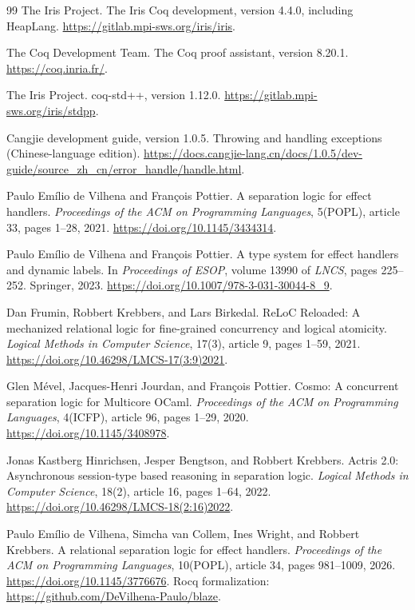 \documentclass[11pt]{article}
\begin{document}
\begin{thebibliography}{99}
The Iris Project.
The Iris Coq development, version 4.4.0, including HeapLang.
\url{https://gitlab.mpi-sws.org/iris/iris}.

The Coq Development Team.
The Coq proof assistant, version 8.20.1.
\url{https://coq.inria.fr/}.

The Iris Project.
coq-std++, version 1.12.0.
\url{https://gitlab.mpi-sws.org/iris/stdpp}.

Cangjie development guide, version 1.0.5.
Throwing and handling exceptions (Chinese-language edition).
\url{https://docs.cangjie-lang.cn/docs/1.0.5/dev-guide/source_zh_cn/error_handle/handle.html}.

Paulo Em\'ilio de Vilhena and Fran\c{c}ois Pottier.
A separation logic for effect handlers.
\emph{Proceedings of the ACM on Programming Languages}, 5(POPL), article 33, pages 1--28, 2021.
\url{https://doi.org/10.1145/3434314}.

Paulo Em\'ilio de Vilhena and Fran\c{c}ois Pottier.
A type system for effect handlers and dynamic labels.
In \emph{Proceedings of ESOP}, volume 13990 of \emph{LNCS}, pages 225--252. Springer, 2023.
\url{https://doi.org/10.1007/978-3-031-30044-8_9}.

Dan Frumin, Robbert Krebbers, and Lars Birkedal.
ReLoC Reloaded: A mechanized relational logic for fine-grained concurrency and logical atomicity.
\emph{Logical Methods in Computer Science}, 17(3), article 9, pages 1--59, 2021.
\url{https://doi.org/10.46298/LMCS-17(3:9)2021}.

Glen M\'evel, Jacques-Henri Jourdan, and Fran\c{c}ois Pottier.
Cosmo: A concurrent separation logic for Multicore OCaml.
\emph{Proceedings of the ACM on Programming Languages}, 4(ICFP), article 96, pages 1--29, 2020.
\url{https://doi.org/10.1145/3408978}.

Jonas Kastberg Hinrichsen, Jesper Bengtson, and Robbert Krebbers.
Actris 2.0: Asynchronous session-type based reasoning in separation logic.
\emph{Logical Methods in Computer Science}, 18(2), article 16, pages 1--64, 2022.
\url{https://doi.org/10.46298/LMCS-18(2:16)2022}.

Paulo Em\'ilio de Vilhena, Simcha van Collem, Ines Wright, and Robbert Krebbers.
A relational separation logic for effect handlers.
\emph{Proceedings of the ACM on Programming Languages}, 10(POPL), article 34, pages 981--1009, 2026.
\url{https://doi.org/10.1145/3776676}.
Rocq formalization: \url{https://github.com/DeVilhena-Paulo/blaze}.

\end{thebibliography}
\end{document}
